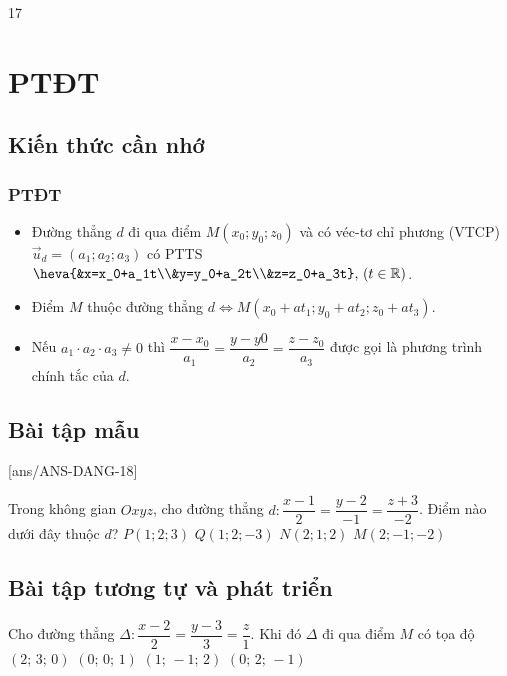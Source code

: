 \setcounter {section} {17}
\setcounter{ex}{0}
\section{PTĐT}
\subsection{Kiến thức cần nhớ}
\begin{khung}
	\subsubsection{PTĐT}
	\begin{itemize}
		\item Đường thẳng $d$ đi qua điểm $M(x_0;y_0;z_0)$ và có véc-tơ chỉ phương (VTCP) $\vec{u}_d=(a_1;a_2;a_3)$ có PTTS $\heva{&x=x_0+a_1t\\&y=y_0+a_2t\\&z=z_0+a_3t},\, ( t\in \mathbb{R})$.
		\item Điểm $M$ thuộc đường thẳng $d\Leftrightarrow M(x_0+at_1;y_0+at_2;z_0+at_3)$.
		\item Nếu $a_1\cdot a_2\cdot a_3 \ne 0$ thì $\dfrac{x-x_0}{a_1}=\dfrac{y-y0}{a_2}=\dfrac{z-z_0}{a_3}$ được gọi là phương trình chính tắc của $d$. 
	\end{itemize}
\end{khung}
\subsection{Bài tập mẫu}
[ans/ANS-DANG-18]
\begin{khung}
	\begin{vd}%
		Trong không gian $O x y z$, cho đường thẳng $d: \dfrac{x-1}{2}=\dfrac{y-2}{-1}=\dfrac{z+3}{-2}$. Điểm nào dưới đây thuộc $d$?
		\choice
		{$P(1; 2; 3)$}
		{\True $Q(1; 2;-3)$}
		{$N(2; 1; 2)$}
		{$M(2;-1;-2)$}
	\end{vd}
\end{khung}
\subsection{Bài tập tương tự và phát triển}
\begin{ex}%
	Cho đường thẳng $\Delta\colon\dfrac{x-2}{2}=\dfrac{y-3}{3}=\dfrac{z}{1}$. Khi đó $\Delta $ đi qua điểm $ M$ có tọa độ
	\choice
	{\True $\left(2;\,3;\,0\right)$}
	{$\left(0;\,0;\,1\right)$}
	{$\left(1;\,-1;\,2\right)$}
	{$\left(0;\,2;\,-1\right)$}
\end{ex}


